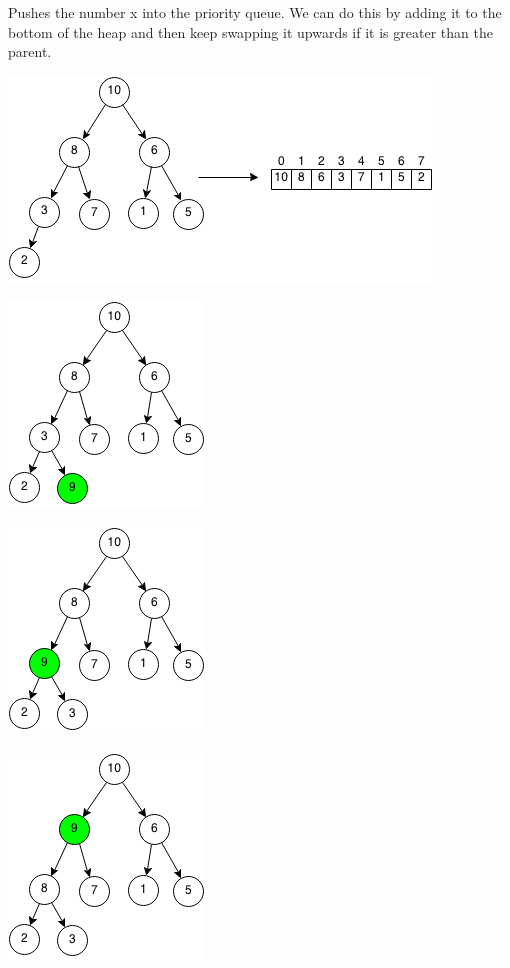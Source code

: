 \documentclass[11pt,oneside]{book}
\makeatletter
\def\maxwidth#1{\ifdim\Gin@nat@width>#1 #1\else\Gin@nat@width\fi}
\makeatother
\begin{document}
Pushes the number x into the priority queue. We can do this by adding it to the bottom of the heap and then keep swapping it upwards if it is greater than the parent.

\includegraphics[width=\maxwidth{\textwidth}]{maxheap.png}

\includegraphics[width=\maxwidth{\textwidth}]{maxheappush.png}

\includegraphics[width=\maxwidth{\textwidth}]{maxheappush2.png}

\includegraphics[width=\maxwidth{\textwidth}]{maxheappush3.png}
\end{document}
